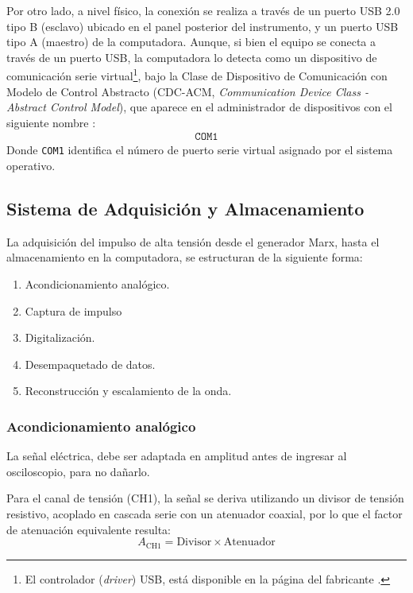 Por otro lado, a nivel físico, la conexión se realiza a través de un puerto USB 2.0 tipo B (esclavo) ubicado en el panel posterior del instrumento, y un puerto USB tipo A (maestro) de la computadora. Aunque, si bien el equipo se conecta a través de un puerto USB, la computadora lo detecta como un dispositivo de comunicación serie virtual\footnote{El controlador (\emph{driver}) USB, está disponible en la página del fabricante \cite{gds1000au_driver}.}, bajo la Clase de Dispositivo de Comunicación con Modelo de Control Abstracto (CDC-ACM, \emph{Communication Device Class - Abstract Control Model}), que aparece en el administrador de dispositivos con el siguiente nombre \cite{gds1000au_ProgrammingManual}:
\begin{align*}
    \texttt{COM1}
\end{align*}
Donde \texttt{COM1} identifica el número de puerto serie virtual asignado por el sistema operativo.

\subsection{Sistema de Adquisición y Almacenamiento}
\label{subsec:arquitectura_flujo}

La adquisición del impulso de alta tensión desde el generador Marx, hasta el almacenamiento en la computadora, se estructuran de la siguiente forma:

\begin{enumerate}
    \item Acondicionamiento analógico.
    \item Captura de impulso
    \item Digitalización.
    \item Desempaquetado de datos.
    \item Reconstrucción y escalamiento de la onda.
\end{enumerate}

\subsubsection{Acondicionamiento analógico}

La señal eléctrica, debe ser adaptada en amplitud antes de ingresar al osciloscopio, para no dañarlo.

Para el canal de tensión (CH1), la señal se deriva utilizando un divisor de tensión resistivo, acoplado en cascada serie con un atenuador coaxial, por lo que el factor de atenuación equivalente resulta:
\begin{equation}
    \label{eq:atenuacion_tension}
    A_{\text{CH1}} = \text{Divisor} \times \text{Atenuador}
\end{equation}

